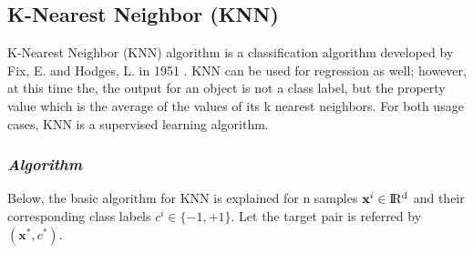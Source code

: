 \subsection{K-Nearest Neighbor (KNN)}

K-Nearest Neighbor (KNN) algorithm is a classification algorithm developed by Fix, E. and Hodges, L. in 1951 \cite{knn_pdf}. KNN can be used for regression as well; however, at this time the, the output for an object is not a class label, but the property value which is the average of the values of its k nearest neighbors. For both usage cases, KNN is a supervised learning algorithm.

\subsubsection*{\textit{Algorithm}}

Below, the basic algorithm for KNN is explained for n samples $\textbf{x}^{i} \in \rm I\!R^{d}$ and their corresponding class labels $c^{i} \in \{-1, +1\}$. Let the target pair is referred by $(\textbf{x}^{*}, c^{*})$.

